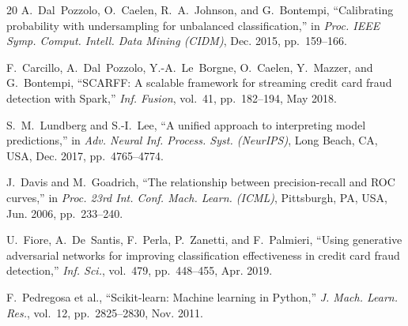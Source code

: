 \documentclass[conference,10pt]{IEEEtran}
\begin{document}
\begin{thebibliography}{20}
A.~Dal~Pozzolo, O.~Caelen, R.~A.~Johnson, and G.~Bontempi, ``Calibrating probability with undersampling for unbalanced classification,'' in \textit{Proc. IEEE Symp. Comput. Intell. Data Mining (CIDM)}, Dec. 2015, pp.~159--166.

F.~Carcillo, A.~Dal~Pozzolo, Y.-A.~Le~Borgne, O.~Caelen, Y.~Mazzer, and G.~Bontempi, ``SCARFF: A scalable framework for streaming credit card fraud detection with Spark,'' \textit{Inf. Fusion}, vol.~41, pp.~182--194, May 2018.

S.~M.~Lundberg and S.-I.~Lee, ``A unified approach to interpreting model predictions,'' in \textit{Adv. Neural Inf. Process. Syst. (NeurIPS)}, Long Beach, CA, USA, Dec. 2017, pp.~4765--4774.

J.~Davis and M.~Goadrich, ``The relationship between precision-recall and ROC curves,'' in \textit{Proc. 23rd Int. Conf. Mach. Learn. (ICML)}, Pittsburgh, PA, USA, Jun. 2006, pp.~233--240.

U.~Fiore, A.~De~Santis, F.~Perla, P.~Zanetti, and F.~Palmieri, ``Using generative adversarial networks for improving classification effectiveness in credit card fraud detection,'' \textit{Inf. Sci.}, vol.~479, pp.~448--455, Apr. 2019.

F.~Pedregosa et al., ``Scikit-learn: Machine learning in Python,'' \textit{J. Mach. Learn. Res.}, vol.~12, pp.~2825--2830, Nov. 2011.

\end{thebibliography}
\end{document}
